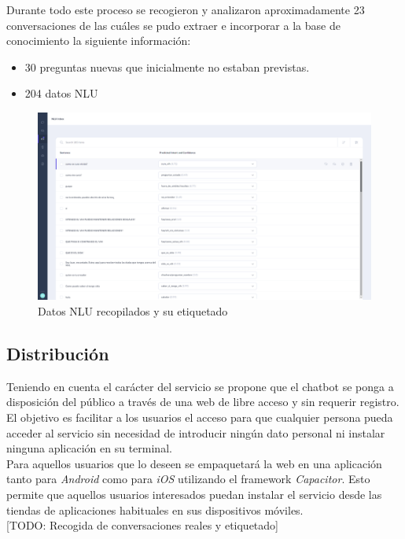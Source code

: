 Durante todo este proceso se recogieron y analizaron aproximadamente 23 conversaciones de las cuáles se pudo extraer e incorporar a la base de conocimiento la siguiente información:\\

\begin{itemize}
	\item 30 preguntas nuevas que inicialmente no estaban previstas.
	\item 204 datos NLU
\end{itemize}


\begin{figure}[htbp]
\centering
\includegraphics[scale=0.3]{../images/collected_nlu.png} 
\caption{Datos NLU recopilados y su etiquetado}
\label{fig:collected nlu}
\end{figure}


\subsection{Distribución}
Teniendo en cuenta el carácter del servicio se propone que el chatbot se ponga a disposición del público a través de una web de libre acceso y sin requerir registro. El objetivo es facilitar a los usuarios el acceso para que cualquier persona pueda acceder al servicio sin necesidad de introducir ningún dato personal ni instalar ninguna aplicación en su terminal. \\

Para aquellos usuarios que lo deseen se empaquetará la web en una aplicación tanto para \textit{Android} como para \textit{iOS} utilizando el framework \textit{Capacitor}. Esto permite que aquellos usuarios interesados puedan instalar el servicio desde las tiendas de aplicaciones habituales en sus dispositivos móviles.\\


[TODO: Recogida de conversaciones reales y etiquetado]



